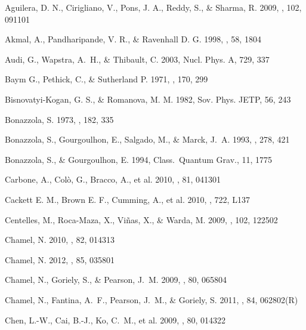 \documentclass{aa}
\begin{document}
\begin{thebibliography}{}

Aguilera, D. N., Cirigliano, V., Pons, J. A., Reddy, S., \& Sharma, R.
2009,
\prl, 102, 091101

Akmal, A., Pandharipande, V. R., \& Ravenhall D. G.
1998,
\prc, 58, 1804

Audi, G., Wapstra, A.~H., \& Thibault, C. 
2003, Nucl. Phys. A, 729, 337 

Baym G., Pethick, C., \& Sutherland P. 
1971, 
\apj, 170, 299

Bisnovatyi-Kogan, G. S., \& Romanova, M. M.
1982,
Sov. Phys. JETP, 56, 243

Bonazzola, S.
1973, 
\apj, 182, 335

Bonazzola, S., Gourgoulhon, E., Salgado, M., \& Marck, J.~A.
1993,
\aap, 278, 421

Bonazzola, S., \& Gourgoulhon, E.
1994, 
Class.\ Quantum Grav., 11, 1775 

Carbone, A., Col{\`o}, G., Bracco, A., et al.
2010,
\prc, 81, 041301

Cackett E. M., Brown E. F., Cumming, A., et al.
2010,
\apj, 722, L137

Centelles, M., Roca-Maza, X., Vi{\~n}as, X., \& Warda, M. 
2009, 
\prl, 102, 122502 

Chamel, N.
2010,
\prc, 82, 014313

Chamel, N.
2012,
\prc, 85, 035801

Chamel, N., Goriely, S., \& Pearson, J.~M.
2009,
\prc, 80, 065804

Chamel, N., Fantina, A.~F., Pearson, J.~M., \& Goriely, S.
2011,
\prc, 84, 062802(R)

Chen, L.-W., Cai, B.-J., Ko, C.~M., et al. 
2009, 
\prc, 80, 014322 


\end{thebibliography}
\end{document}
